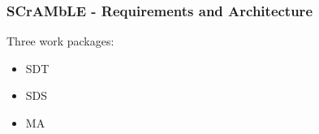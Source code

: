 \begin{frame}
\frametitle{SCrAMbLE - Requirements and Architecture}

Three work packages:


\begin{itemize}
	
	\item SDT
	\item SDS
	\item MA
\end{itemize}






\end{frame}